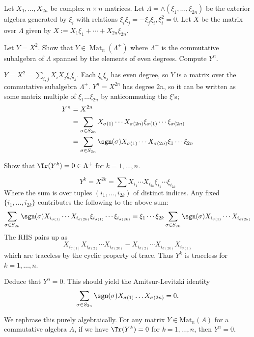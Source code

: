 \documentclass[11pt, headheight=30pt]{scrartcl}
\DeclareMathOperator{\Mat}{Mat}
\begin{document}
\setcounter{prob*}{2}
\begin{prob*}
    Let $X_1, \dots, X_{2n}$ be complex $n \times n$ matrices. Let $\Lambda = \wedge(\xi_1, \dots, \xi_{2n})$ be the exterior algebra generated by $\xi_i$ with relations $\xi_i \xi_j = -\xi_j \xi_i, \xi_i^2 = 0$. Let $X$ be the matrix over $\Lambda$ given by $X := X_1 \xi_1 + \cdots + X_{2n} \xi_{2n}$.
\end{prob*}
\begin{prob}
    Let $Y = X^2$. Show that $Y \in \Mat_n(\Lambda^+)$ where $\Lambda^+$ is the commutative subalgebra of $\Lambda$ spanned by the elements of even degrees. Compute $Y^n$.
\end{prob}
$Y = X^2 = \sum_{i,j} X_i X_j \xi_i \xi_j$. Each $\xi_i \xi_j$ has even degree, so $Y$ is a matrix over the commutative subalgebra $\Lambda^+$. $Y^n = X^{2n}$ has degree $2n$, so it can be written as some matrix multiple of $\xi_1 \dots \xi_{2n}$ by anticommuting the $\xi$'s;
\begin{align*}
    Y^n &= X^{2n}\\
        &= \sum_{\sigma \in S_{2n}} X_{\sigma(1)} \cdots X_{\sigma(2n)} \xi_{\sigma(1)} \cdots \xi_{\sigma(2n)}\\
        &= \sum_{\sigma \in S_{2n}} \sgn(\sigma) X_{\sigma(1)} \cdots X_{\sigma(2n)} \xi_1 \cdots \xi_{2n}
\end{align*}

\begin{prob}
    Show that $\Tr(Y^k) = 0 \in \Lambda^+$ for $k = 1, \dots, n$.
\end{prob}
\[
    Y^k = X^{2k} = \sum X_{i_1} \cdots X_{i_{2k}} \xi_{i_1} \cdots \xi_{i_{2k}}
\]
Where the sum is over tuples $(i_1, \dots, i_{2k})$ of distinct indices. Any fixed $\{i_1, \dots, i_{2k}\}$ contributes the following to the above sum:
\[
    \sum_{\sigma \in S_{2k}} \sgn(\sigma) X_{i_{\sigma(1)}} \cdots X_{i_{\sigma(2k)}} \xi_{i_{\sigma(1)}} \cdots \xi_{i_{\sigma(2k)}} = \xi_1 \cdots \xi_{2k} \sum_{\sigma \in S_{2k}} \sgn(\sigma) X_{i_{\sigma(1)}} \cdots X_{i_{\sigma(2k)}} 
\]
The RHS pairs up as
\[X_{i_{\sigma(1)}} X_{i_{\sigma(2)}} \cdots X_{i_{\sigma(2k)}} - X_{i_{\sigma(2)}} \cdots X_{i_{\sigma(2k)}} X_{i_{\sigma(1)}}\]
which are traceless by the cyclic property of trace. Thus $Y^k$ is traceless for $k = 1, \dots, n$.

\begin{prob}
    Deduce that $Y^n = 0$. This should yield the Amitsur-Levitzki identity
    \[
    \sum_{\sigma \in S_{2n}} \sgn(\sigma) X_{\sigma(1)} \dots X_{\sigma(2n)} = 0.
    \]
\end{prob}
We rephrase this purely algebraically. For any matrix $Y \in \mathrm{Mat}_n(A)$ for a commutative algebra $A$, if we have $\Tr(Y^k) = 0$ for $k = 1, \dots, n$, then $Y^n = 0$.
\end{document}
